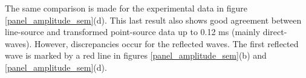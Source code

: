 \documentclass[paper,extra]{gji} %
\newcommand{\twod}{2-D }
\newcommand{\thrd}{3-D }
\begin{document}
\noindent The same comparison is made for the experimental data in figure \ref{panel_amplitude_sem}(d). This last result also shows good agreement between line-source and transformed point-source data up to 0.12 ms (mainly direct-waves). However, discrepancies occur for the reflected waves. The first reflected wave is marked by a red line in figures \ref{panel_amplitude_sem}(b) and \ref{panel_amplitude_sem}(d).
\end{document}
